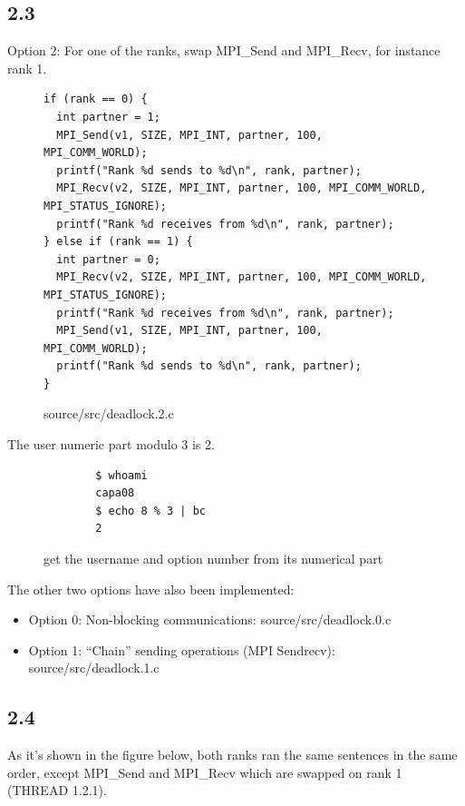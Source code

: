 \documentclass[12pt]{article}
\begin{document}
\newpage

\subsection*{2.3}

Option 2: For one of the ranks, swap MPI\_Send and MPI\_Recv, for instance rank 1.

\begin{figure}[h!]
	\begin{verbatim}
if (rank == 0) {
  int partner = 1;
  MPI_Send(v1, SIZE, MPI_INT, partner, 100, MPI_COMM_WORLD);
  printf("Rank %d sends to %d\n", rank, partner);
  MPI_Recv(v2, SIZE, MPI_INT, partner, 100, MPI_COMM_WORLD, MPI_STATUS_IGNORE);
  printf("Rank %d receives from %d\n", rank, partner);
} else if (rank == 1) {
  int partner = 0;
  MPI_Recv(v2, SIZE, MPI_INT, partner, 100, MPI_COMM_WORLD, MPI_STATUS_IGNORE);
  printf("Rank %d receives from %d\n", rank, partner);
  MPI_Send(v1, SIZE, MPI_INT, partner, 100, MPI_COMM_WORLD);
  printf("Rank %d sends to %d\n", rank, partner);
}
	\end{verbatim}
	\caption{source/src/deadlock.2.c}\label{code:build}
\end{figure}

The user numeric part modulo 3 is 2.

\begin{figure}[h!]
	\begin{verbatim}
		$ whoami 
		capa08
		$ echo 8 % 3 | bc
		2
	\end{verbatim}
	\caption{get the username and option number from its numerical part}\label{code:user}
\end{figure}

The other two options have also been implemented:

\begin{itemize}
	\item Option 0: Non-blocking communications: source/src/deadlock.0.c
	\item Option 1:	“Chain” sending operations (MPI Sendrecv): source/src/deadlock.1.c
\end{itemize}

\newpage

\subsection*{2.4}

As it's shown in the figure below, both ranks ran the same sentences in the same order, except MPI\_Send and MPI\_Recv which are swapped on rank 1 (THREAD 1.2.1).
\end{document}
